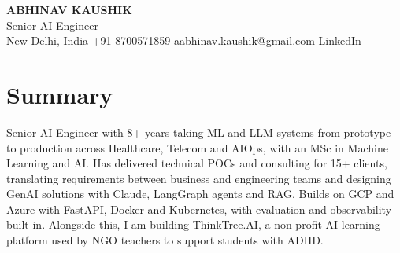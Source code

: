 \documentclass[10pt,a4paper]{article}
\begin{document}
\begin{center}
  {\LARGE\bfseries ABHINAV KAUSHIK}\\[2pt]
  {\large Senior AI Engineer}\\[2pt]
  New Delhi, India \textbar{} +91 8700571859 \textbar{} \href{mailto:aabhinav.kaushik@gmail.com}{aabhinav.kaushik@gmail.com} \textbar{} \href{https://www.linkedin.com/in/abhinav-kaushik10/}{LinkedIn}  
\end{center}

\section{Summary}
Senior AI Engineer with 8+ years taking ML and LLM systems from prototype to production across Healthcare, Telecom and AIOps, with an MSc in Machine Learning and AI. Has delivered technical POCs and consulting for 15+ clients, translating requirements between business and engineering teams and designing GenAI solutions with Claude, LangGraph agents and RAG. Builds on GCP and Azure with FastAPI, Docker and Kubernetes, with evaluation and observability built in. Alongside this, I am building ThinkTree.AI, a non-profit AI learning platform used by NGO teachers to support students with ADHD.
\end{document}
